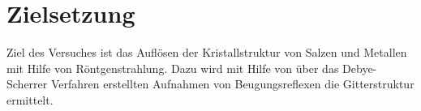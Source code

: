 \section{Zielsetzung}
\label{sec:zielsetzung}
%
Ziel des Versuches  ist das Auflösen der Kristallstruktur von Salzen und Metallen mit Hilfe von Röntgenstrahlung. Dazu wird mit Hilfe von
über das Debye-Scherrer Verfahren erstellten Aufnahmen von Beugungsreflexen die Gitterstruktur ermittelt.
